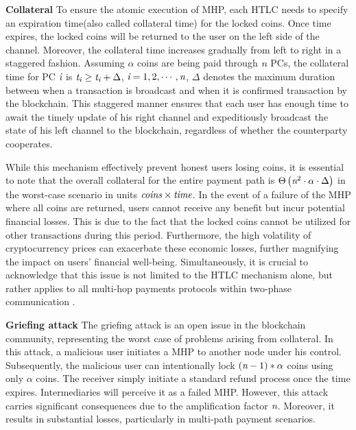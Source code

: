 \documentclass[conference]{IEEEtran}
\begin{document}
\textbf{Collateral} To ensure the atomic execution of MHP, each HTLC needs to specify an expiration time(also called 
collateral time) for the locked coins. Once time expires, the locked coins will be returned to the user on the left 
side of the channel. Moreover, the collateral time increases gradually from left to right in a staggered fashion. 
Assuming $\alpha$ coins are being paid through $\emph{n}$ PCs, the collateral time for PC $\emph{i}$ is $\emph{t}_{\emph{i}}\geq\emph{t}_{\emph{i}}+\Delta$, 
$\emph{i}=1,2,\cdots ,\emph{n}$, $\Delta$ denotes the maximum duration between when a transaction is broadcast and 
when it is confirmed transaction by the blockchain. This staggered manner ensures that each user has enough time to 
await the timely update of his right channel and expeditiously broadcast the state of his left channel to the blockchain, 
regardless of whether the counterparty cooperates. 

While this mechanism effectively prevent honest users losing coins, it is essential to note that the overall collateral 
for the entire payment path is $\Theta \left ( \emph{n}^{2}\cdot \alpha\cdot  \Delta  \right )$ in the worst-case 
scenario in units $ \emph{coins}\times \emph{time}$. In the event of a failure of the MHP where all coins are returned, 
users cannot receive any benefit but incur potential financial losses. This is due to the fact that the locked coins 
cannot be utilized for other transactions during this period. Furthermore, the high volatility of cryptocurrency 
prices can exacerbate these economic losses, further magnifying the impact on users' financial well-being. 
Simultaneously, it is crucial to acknowledge that this issue is not limited to the HTLC mechanism alone, 
but rather applies to all multi-hop payments protocols within two-phase communication \cite{blitz}. 

\textbf{Griefing attack} The griefing attack \cite{amcu} is an open issue in the blockchain community, representing
the worst case of problems arising from collateral. In this attack, a malicious user initiates a MHP to another node 
under his control. Subsequently, the malicious user can intentionally lock $\left ( \emph{n}-1 \right )\ast \alpha $
coins using only $\alpha$ coins. The receiver simply initiate a standard refund process once the time expires. 
Intermediaries will perceive it as a failed MHP. However, this attack carries significant consequences due to the 
amplification factor $\emph{n}$. Moreover, it results in substantial losses, particularly in multi-path payment 
scenarios. 
\end{document}
